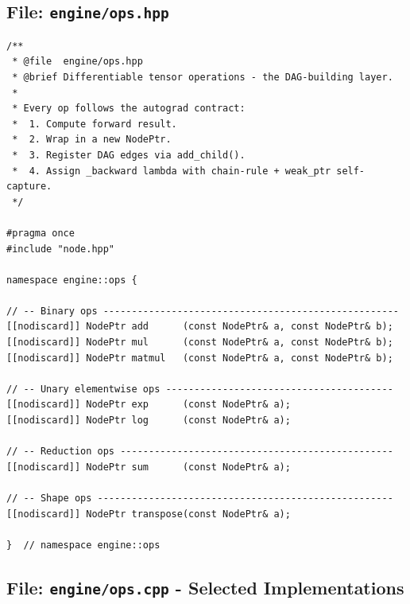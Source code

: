 \documentclass[12pt, a4paper]{article}
\begin{document}
\subsection{File: \texttt{engine/ops.hpp}}

\begin{lstlisting}[caption={\texttt{engine/ops.hpp} - complete header}]
/**
 * @file  engine/ops.hpp
 * @brief Differentiable tensor operations - the DAG-building layer.
 *
 * Every op follows the autograd contract:
 *  1. Compute forward result.
 *  2. Wrap in a new NodePtr.
 *  3. Register DAG edges via add_child().
 *  4. Assign _backward lambda with chain-rule + weak_ptr self-capture.
 */

#pragma once
#include "node.hpp"

namespace engine::ops {

// -- Binary ops ----------------------------------------------------
[[nodiscard]] NodePtr add      (const NodePtr& a, const NodePtr& b);
[[nodiscard]] NodePtr mul      (const NodePtr& a, const NodePtr& b);
[[nodiscard]] NodePtr matmul   (const NodePtr& a, const NodePtr& b);

// -- Unary elementwise ops ----------------------------------------
[[nodiscard]] NodePtr exp      (const NodePtr& a);
[[nodiscard]] NodePtr log      (const NodePtr& a);

// -- Reduction ops ------------------------------------------------
[[nodiscard]] NodePtr sum      (const NodePtr& a);

// -- Shape ops ----------------------------------------------------
[[nodiscard]] NodePtr transpose(const NodePtr& a);

}  // namespace engine::ops
\end{lstlisting}

\subsection{File: \texttt{engine/ops.cpp} - Selected Implementations}
\end{document}

